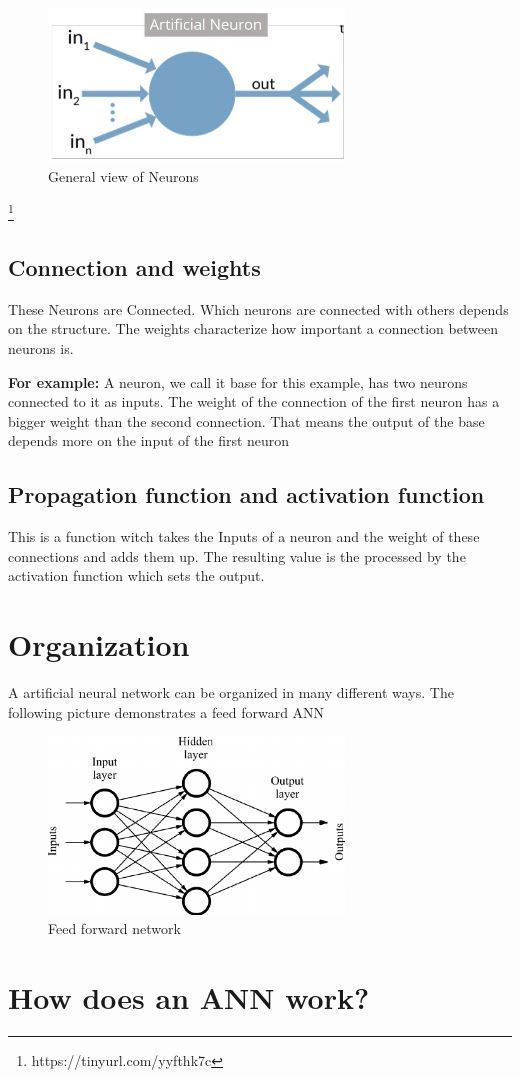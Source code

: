 \begin{figure}[H]
	\centering
	\includegraphics[width=0.7\textwidth]{./media/images/diagram-for-general-view-of-artificial-neuron.jpg}
  	\caption{General view of Neurons}
  	\label{htl01}
\end{figure}
\footnote{https://tinyurl.com/yyfthk7c}

\subsection{Connection and weights}

These Neurons are Connected. Which neurons are connected with others depends on the structure. The weights characterize how important a connection between neurons is. 

\textbf{For example:}\newline
A neuron, we call it base for this example, has two neurons connected to it as inputs. The weight of the connection of the first neuron has a bigger weight than the second connection. That means the output of the base depends more on the input of the first neuron 

\subsection{Propagation function  and activation function}

This is a function witch takes the Inputs of a neuron and the weight of these connections and adds them up. The resulting value is the processed by the activation function which sets the output.

\section{Organization}

A artificial neural network can be organized in many different ways. The following picture demonstrates a feed forward ANN 
\begin{figure}[H]
	\centering
	\includegraphics[width=0.7\textwidth]{./media/images/feed_forward_neural_network.png}
  	\caption{Feed forward network}
  	\label{htl01}
\end{figure}
\section{How does an ANN work?}



